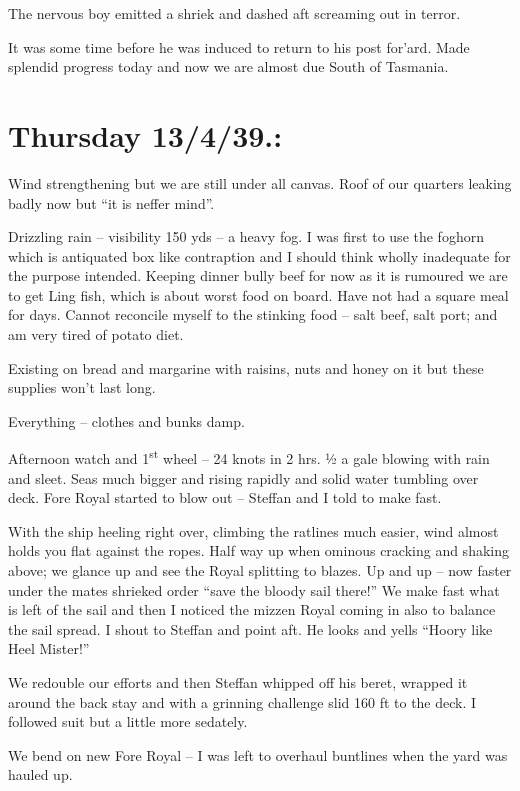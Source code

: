 \documentclass[
  11pt,
  msmallroyalvopaper
]{memoir}
\begin{document}
The nervous boy emitted a shriek and dashed aft screaming out in terror.

It was some time before he was induced to return to his post for'ard.
Made splendid progress today and now we are almost due South of
Tasmania.

\hypertarget{thursday-13439.}{%
\section{Thursday 13/4/39.:}\label{thursday-13439.}}

Wind strengthening but we are still under all canvas. Roof of our
quarters leaking badly now but ``it is neffer mind''.

Drizzling rain -- visibility 150 yds -- a heavy fog. I was first to use
the foghorn which is antiquated box like contraption and I should think
wholly inadequate for the purpose intended. Keeping dinner bully beef
for now as it is rumoured we are to get Ling fish, which is about worst
food on board. Have not had a square meal for days. Cannot reconcile
myself to the stinking food -- salt beef, salt port; and am very tired
of potato diet.

Existing on bread and margarine with raisins, nuts and honey on it but
these supplies won't last long.

Everything -- clothes and bunks damp.

Afternoon watch and 1\textsuperscript{st} wheel -- 24 knots in 2 hrs. ½
a gale blowing with rain and sleet. Seas much bigger and rising rapidly
and solid water tumbling over deck. Fore Royal started to blow out --
Steffan and I told to make fast.

With the ship heeling right over, climbing the ratlines much easier,
wind almost holds you flat against the ropes. Half way up when ominous
cracking and shaking above; we glance up and see the Royal splitting to
blazes. Up and up -- now faster under the mates shrieked order ``save
the bloody sail there!'' We make fast what is left of the sail and then
I noticed the mizzen Royal coming in also to balance the sail spread. I
shout to Steffan and point aft. He looks and yells ``Hoory like Heel
Mister!''

We redouble our efforts and then Steffan whipped off his beret, wrapped
it around the back stay and with a grinning challenge slid 160 ft to the
deck. I followed suit but a little more sedately.

We bend on new Fore Royal -- I was left to overhaul buntlines when the
yard was hauled up.
\end{document}
